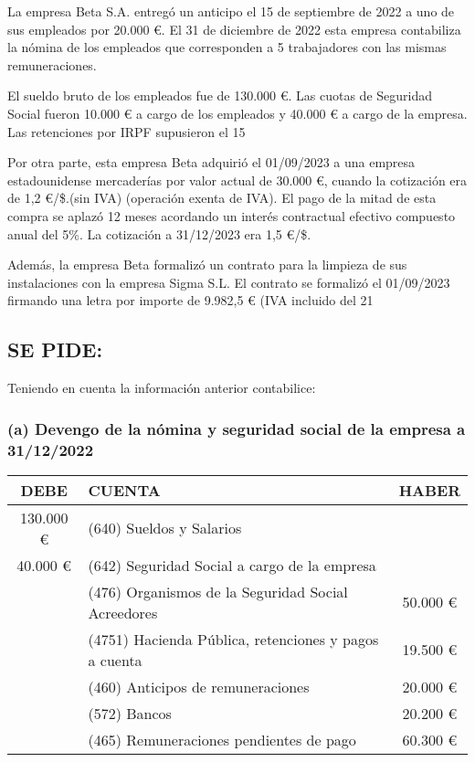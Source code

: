 La empresa Beta S.A. entregó un anticipo el 15 de septiembre de 2022 a uno de sus empleados por 20.000 €. El 31 de diciembre de 2022 esta empresa contabiliza la nómina de los empleados que corresponden a 5 trabajadores con las mismas remuneraciones.

El sueldo bruto de los empleados fue de 130.000 €. Las cuotas de Seguridad Social fueron 10.000 € a cargo de los empleados y 40.000 € a cargo de la empresa. Las retenciones por IRPF supusieron el 15%

Por otra parte, esta empresa Beta adquirió el 01/09/2023 a una empresa estadounidense mercaderías por valor actual de 30.000 €, cuando la cotización era de 1,2 €/\$.(sin IVA) (operación exenta de IVA). El pago de la mitad de esta compra se aplazó 12 meses acordando un interés contractual efectivo compuesto anual del 5\%. La cotización a 31/12/2023 era 1,5 €/\$.

Además, la empresa Beta formalizó un contrato para la limpieza de sus instalaciones con la empresa Sigma S.L. El contrato se formalizó el 01/09/2023 firmando una letra por importe de 9.982,5 € (IVA incluido del 21%

\subsection*{SE PIDE:}
Teniendo en cuenta la información anterior contabilice:

\subsubsection*{(a) Devengo de la nómina y seguridad social de la empresa a 31/12/2022}

\begin{table}[h!]
\centering
\begin{tabular}{|c|l|c|}
\hline
\textbf{DEBE} & \textbf{CUENTA} & \textbf{HABER} \\ \hline
130.000 €     & (640) Sueldos y Salarios & \\ \hline
40.000 €      & (642) Seguridad Social a cargo de la empresa & \\ \hline
              & (476) Organismos de la Seguridad Social Acreedores & 50.000 € \\ \hline
              & (4751) Hacienda Pública, retenciones y pagos a cuenta & 19.500 € \\ \hline
              & (460) Anticipos de remuneraciones & 20.000 € \\ \hline
              & (572) Bancos & 20.200 € \\ \hline
              & (465) Remuneraciones pendientes de pago & 60.300 € \\ \hline
\end{tabular}
\end{table}

